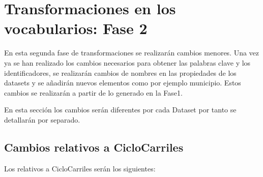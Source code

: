 \section{Transformaciones en los vocabularios: Fase 2}

En esta segunda fase de transformaciones se realizarán cambios menores. Una vez ya se han realizado los cambios necesarios para obtener las palabras clave y los identificadores, se realizarán cambios de nombres en las propiedades de los datasets y se añadirán nuevos elementos como por ejemplo municipio.
\newline
Estos cambios se realizarán a partir de lo generado en la Fase1.
\newline

En esta sección los cambios serán diferentes por cada Dataset por tanto se detallarán por separado.
\newline

\subsection{Cambios relativos a CicloCarriles}

Los relativos a CicloCarriles serán los siguientes:

